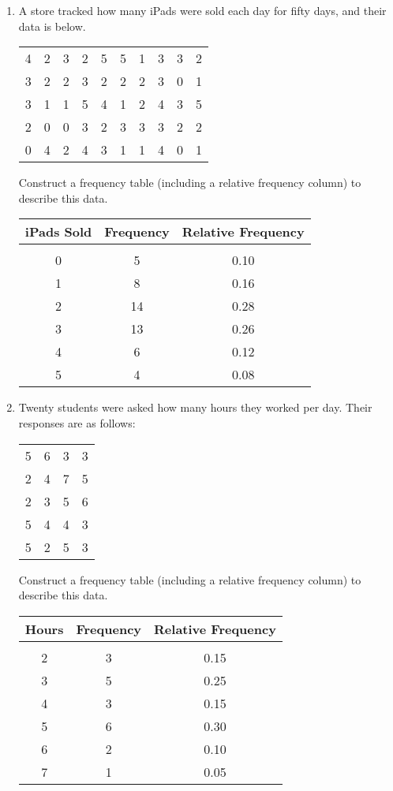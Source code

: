 \begin{enumerate}
\item A store tracked how many iPads were sold each day for fifty days, and their data is below.
\begin{center}
\begin{tabular}{c c c c c c c c c c}
4 & 2 & 3 & 2 & 5 & 5 & 1 & 3 & 3 & 2\\
3 & 2 & 2 & 3 & 2 & 2 & 2 & 3 & 0 & 1\\
3 & 1 & 1 & 5 & 4 & 1 & 2 & 4 & 3 & 5\\
2 & 0 & 0 & 3 & 2 & 3 & 3 & 3 & 2 & 2\\
0 & 4 & 2 & 4 & 3 & 1 & 1 & 4 & 0 & 1
\end{tabular}
\end{center}
Construct a frequency table (including a relative frequency column) to describe this data.

\begin{center}
\begin{tabular}{c c c}
\textbf{iPads Sold} & \textbf{Frequency} & \textbf{Relative Frequency}\\
\hline
& & \\
0 & 5 & 0.10\\
1 & 8 & 0.16\\
2 & 14 & 0.28\\
3 & 13 & 0.26\\
4 & 6 & 0.12\\
5 & 4 & 0.08
\end{tabular}
\end{center}
\vfill
\pagebreak

\item Twenty students were asked how many hours they worked per day.  Their responses are as follows:
\begin{center}
\begin{tabular}{c c c c}
5 & 6 & 3 & 3\\
2 & 4 & 7 & 5\\
2 & 3 & 5 & 6\\
5 & 4 & 4 & 3\\
5 & 2 & 5 & 3
\end{tabular}
\end{center}
Construct a frequency table (including a relative frequency column) to describe this data.

\begin{center}
\begin{tabular}{c c c}
\textbf{Hours} & \textbf{Frequency} & \textbf{Relative Frequency}\\
\hline
& & \\
2 & 3 & 0.15\\
3 & 5 & 0.25\\
4 & 3 & 0.15\\
5 & 6 & 0.30\\
6 & 2 & 0.10\\
7 & 1 & 0.05
\end{tabular}
\end{center}


\end{enumerate}
